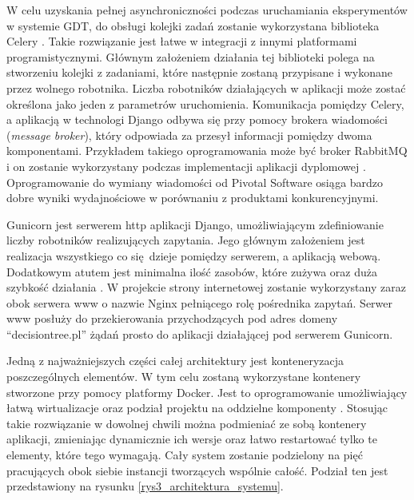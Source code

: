 W celu uzyskania pełnej asynchroniczności podczas uruchamiania eksperymentów w systemie GDT, do obsługi kolejki zadań zostanie wykorzystana biblioteka Celery \cite{misc_celery}. Takie rozwiązanie jest łatwe w integracji z innymi platformami programistycznymi. Głównym założeniem działania tej biblioteki polega na stworzeniu kolejki z zadaniami, które następnie zostaną przypisane i wykonane przez wolnego robotnika. Liczba robotników działających w aplikacji może zostać określona jako jeden z parametrów uruchomienia. Komunikacja pomiędzy Celery, a aplikacją w technologi Django odbywa się przy pomocy brokera wiadomości (\textit{message broker}), który odpowiada za przesył informacji pomiędzy dwoma komponentami. Przykładem takiego oprogramowania może być broker RabbitMQ i on zostanie wykorzystany podczas implementacji aplikacji dyplomowej \cite{misc_rabbit}. Oprogramowanie do wymiany wiadomości od Pivotal Software osiąga bardzo dobre wyniki wydajnościowe w porównaniu z produktami konkurencyjnymi.

Gunicorn jest serwerem http aplikacji Django, umożliwiającym zdefiniowanie liczby robotników realizujących zapytania. Jego głównym założeniem jest realizacja wszystkiego co się dzieje pomiędzy serwerem, a aplikacją webową. Dodatkowym atutem jest minimalna ilość zasobów, które zużywa oraz duża szybkość działania \cite{misc_gunicorn}. W projekcie strony internetowej zostanie wykorzystany zaraz obok serwera www o nazwie Nginx pełniącego rolę pośrednika zapytań. Serwer www posłuży do przekierowania przychodzących pod adres domeny \enquote{decisiontree.pl} żądań prosto do aplikacji działającej pod serwerem Gunicorn.

Jedną z najważniejszych części całej architektury jest konteneryzacja poszczególnych elementów. W tym celu zostaną wykorzystane kontenery stworzone przy pomocy platformy Docker. Jest to oprogramowanie umożliwiający łatwą wirtualizacje oraz podział projektu na oddzielne komponenty \cite{misc_docker}. Stosując takie rozwiązanie w dowolnej chwili można podmieniać ze sobą kontenery aplikacji, zmieniając dynamicznie ich wersje oraz łatwo restartować tylko te elementy, które tego wymagają. Cały system zostanie podzielony na pięć pracujących obok siebie instancji tworzących wspólnie całość. Podział ten jest przedstawiony na rysunku \ref{rys3_architektura_systemu}.


 
 





